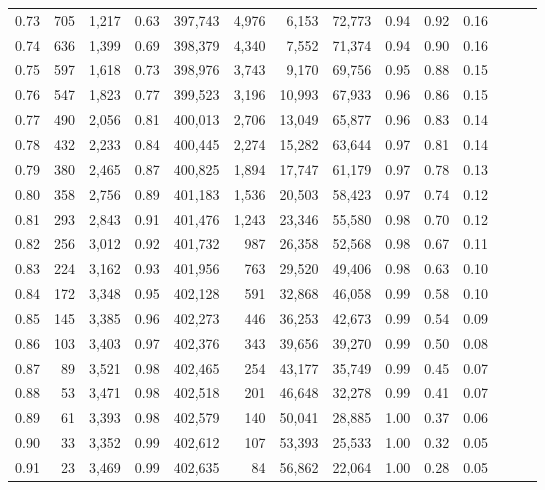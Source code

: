 \begin{tabular}{rrrrrrrrrrrrrr}
0.73 &    705 &  1,217 &  0.63 &  397,743 &    4,976 &   6,153 &  72,773 &  0.94 &  0.92 &      0.16 \\
0.74 &    636 &  1,399 &  0.69 &  398,379 &    4,340 &   7,552 &  71,374 &  0.94 &  0.90 &      0.16 \\
0.75 &    597 &  1,618 &  0.73 &  398,976 &    3,743 &   9,170 &  69,756 &  0.95 &  0.88 &      0.15 \\
0.76 &    547 &  1,823 &  0.77 &  399,523 &    3,196 &  10,993 &  67,933 &  0.96 &  0.86 &      0.15 \\
0.77 &    490 &  2,056 &  0.81 &  400,013 &    2,706 &  13,049 &  65,877 &  0.96 &  0.83 &      0.14 \\
0.78 &    432 &  2,233 &  0.84 &  400,445 &    2,274 &  15,282 &  63,644 &  0.97 &  0.81 &      0.14 \\
0.79 &    380 &  2,465 &  0.87 &  400,825 &    1,894 &  17,747 &  61,179 &  0.97 &  0.78 &      0.13 \\
0.80 &    358 &  2,756 &  0.89 &  401,183 &    1,536 &  20,503 &  58,423 &  0.97 &  0.74 &      0.12 \\
0.81 &    293 &  2,843 &  0.91 &  401,476 &    1,243 &  23,346 &  55,580 &  0.98 &  0.70 &      0.12 \\
0.82 &    256 &  3,012 &  0.92 &  401,732 &      987 &  26,358 &  52,568 &  0.98 &  0.67 &      0.11 \\
0.83 &    224 &  3,162 &  0.93 &  401,956 &      763 &  29,520 &  49,406 &  0.98 &  0.63 &      0.10 \\
0.84 &    172 &  3,348 &  0.95 &  402,128 &      591 &  32,868 &  46,058 &  0.99 &  0.58 &      0.10 \\
0.85 &    145 &  3,385 &  0.96 &  402,273 &      446 &  36,253 &  42,673 &  0.99 &  0.54 &      0.09 \\
0.86 &    103 &  3,403 &  0.97 &  402,376 &      343 &  39,656 &  39,270 &  0.99 &  0.50 &      0.08 \\
0.87 &     89 &  3,521 &  0.98 &  402,465 &      254 &  43,177 &  35,749 &  0.99 &  0.45 &      0.07 \\
0.88 &     53 &  3,471 &  0.98 &  402,518 &      201 &  46,648 &  32,278 &  0.99 &  0.41 &      0.07 \\
0.89 &     61 &  3,393 &  0.98 &  402,579 &      140 &  50,041 &  28,885 &  1.00 &  0.37 &      0.06 \\
0.90 &     33 &  3,352 &  0.99 &  402,612 &      107 &  53,393 &  25,533 &  1.00 &  0.32 &      0.05 \\
0.91 &     23 &  3,469 &  0.99 &  402,635 &       84 &  56,862 &  22,064 &  1.00 &  0.28 &      0.05 \\

\end{tabular}
